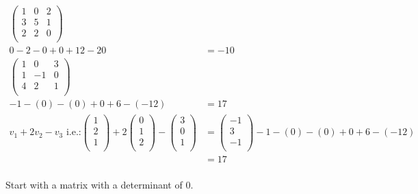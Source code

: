 \documentclass{article}
\begin{document}
\begin{align*}
    \begin{pmatrix}
        1 & 0 & 2 \\
        3 & 5 & 1 \\
        2 & 2 & 0 \\
    \end{pmatrix}                                                                  \\
    0 - 2 - 0 + 0 + 12 - 20      & = -10                                            \\
    \begin{pmatrix}
        1 & 0  & 3 \\
        1 & -1 & 0 \\
        4 & 2  & 1 \\
    \end{pmatrix}                                                                  \\
    -1 -(0) -(0) + 0  + 6 -(-12) & = 17                                             \\
    v_1 + 2v_2 - v_3 \textrm{ i.e.:} \begin{pmatrix} 1 \\ 2 \\ 1 \\ \end{pmatrix} + 2 \begin{pmatrix} 0 \\ 1 \\ 2 \\ \end{pmatrix} - \begin{pmatrix} 3 \\ 0 \\ 1 \\ \end{pmatrix}
                                 & = \begin{pmatrix} -1 \\ 3 \\ -1 \\ \end{pmatrix}
    -1 -(0) -(0) + 0 + 6 -(-12)                                                     \\
                                 & = 17                                             \\
\end{align*}

Start with a matrix with a determinant of 0.
\end{document}
